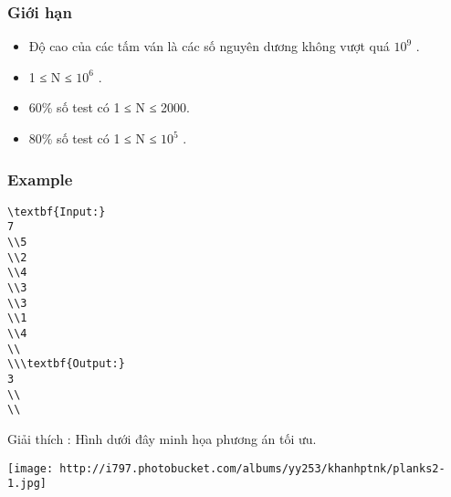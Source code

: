 \subsubsection{   Giới hạn  }
\begin{itemize}
	\item     Độ cao của các tấm ván là các số nguyên dương không vượt quá $10^{9}$    .   
	\item     1 ≤ N ≤ $10^{6}$    .   
	\item     60\% số test có 1 ≤ N ≤ 2000.   
	\item     80\% số test có 1 ≤ N ≤ $10^{5}$    .   
\end{itemize}

\subsubsection{   Example  }
\begin{verbatim}
\textbf{Input:}
7
\\5
\\2
\\4
\\3
\\3
\\1
\\4
\\
\\\textbf{Output:}
3
\\
\\\end{verbatim}

Giải thích        : Hình dưới đây minh họa phương án tối ưu.


\texttt{[image: http://i797.photobucket.com/albums/yy253/khanhptnk/planks2-1.jpg]}
